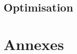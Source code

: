 \documentclass[a4paper,11pt,pdf]{pacmanreport}
\begin{document}





\subsection{Optimisation}





% 


\newpage




\newpage

\appendix
\section{Annexes}

\end{document}
